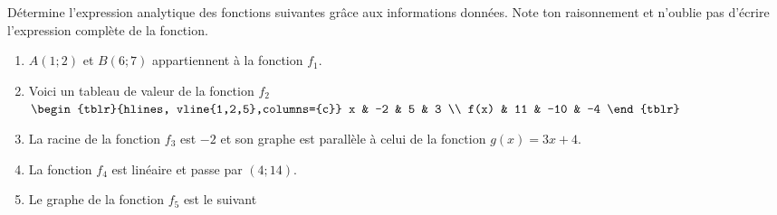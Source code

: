 %
%
    Détermine l'expression analytique des fonctions suivantes grâce aux informations données. Note ton raisonnement et n'oublie pas d'écrire l'expression complète de la fonction.
    \begin{enumerate}
        \item
              $A(1;2)$ et $B(6;7)$ appartiennent à la fonction $f_1$.
        \item
              Voici un tableau de valeur de la fonction $f_2$
              \hfil
              $\begin{tblr}{hlines, vline{1,2,5},columns={c}}
                      x    & -2 & 5   & 3  \\
                      f(x) & 11 & -10 & -4
                  \end{tblr}$
        \item
              La racine de la fonction $f_3$ est $-2$ et son graphe est parallèle à celui de la fonction $g(x)=3x + 4$.
        \item
              La fonction $f_4$ est linéaire et passe par $(4;14)$.
        \item
              Le graphe de la fonction $f_5$ est le suivant\hfil 
    \end{enumerate}
